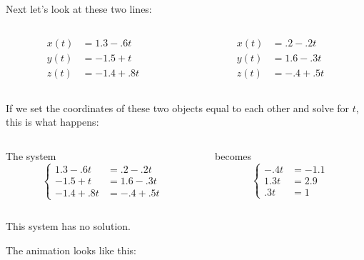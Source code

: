 \documentclass[aspectratio=169]{beamer}
\begin{document}
\begin{frame}
    Next let's look at these two lines:
    \vspace{1.5\baselineskip}
    \begin{columns}
        \begin{column}{0.5\textwidth}
            \[\begin{aligned}
                    x(t) &= 1.3 - .6t\\
                    y(t) &= -1.5 + t\\
                    z(t) &= -1.4 + .8t
                \end{aligned}\]
        \end{column}%
        \begin{column}{0.5\textwidth}
            \[\begin{aligned}
                    x(t) &= .2 - .2t\\
                    y(t) &= 1.6 - .3t\\
                    z(t) &= -.4 + .5t
                \end{aligned}\]
        \end{column}
    \end{columns}
\end{frame}
\begin{frame}
    If we set the coordinates of these two objects equal to each other and solve
    for $t$, this is what happens:\pause

    \begin{columns}
        \begin{column}{.5\textwidth}
            The system
            \[
                \left\{
                    \begin{aligned}
                        1.3 - .6t &= .2 - .2t\\
                        -1.5 + t &= 1.6 - .3t\\
                        -1.4 + .8t &= -.4 + .5t
                    \end{aligned}
                \right.
            \]
        \end{column}\pause%
        \begin{column}{.5\textwidth}
            becomes
            \[
                \left\{
                    \begin{aligned}
                        -.4t &= -1.1\\
                        1.3t &= 2.9\\
                        .3t &= 1
                    \end{aligned}
                \right.
            \]
        \end{column}
    \end{columns}\pause
    \vspace{1.5\baselineskip}
    This system has no solution.\pause

    The animation looks like this:
\end{frame}
\end{document}
